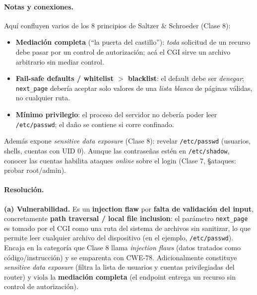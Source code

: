 \paragraph{Notas y conexiones.}
Aquí confluyen varios de los 8 principios de Saltzer \& Schroeder (Clase 8):
\begin{itemize}[leftmargin=1.4em,itemsep=1pt]
  \item \textbf{Mediación completa} (``la puerta del castillo''): \emph{toda} solicitud de un
        recurso debe pasar por un control de autorización; acá el CGI sirve un archivo arbitrario
        sin mediar control.
  \item \textbf{Fail-safe defaults / whitelist $>$ blacklist}: el default debe ser \emph{denegar};
        \texttt{next\_page} debería aceptar solo valores de una \emph{lista blanca} de páginas
        válidas, no cualquier ruta.
  \item \textbf{Mínimo privilegio}: el proceso del servidor no debería poder leer
        \texttt{/etc/passwd}; el daño se contiene si corre confinado.
\end{itemize}
Además expone \emph{sensitive data exposure} (Clase 8): revelar \texttt{/etc/passwd} (usuarios,
shells, cuentas con UID 0). Aunque las contraseñas estén en \texttt{/etc/shadow}, conocer las
cuentas habilita ataques \emph{online} sobre el login (Clase 7, \S ataques: probar root/admin).

\paragraph{Resolución.}
\textbf{(a) Vulnerabilidad.} Es un \textbf{injection flaw} por \textbf{falta de validación del
input}, concretamente \textbf{path traversal / local file inclusion}: el parámetro
\texttt{next\_page} es tomado por el CGI como una ruta del sistema de archivos sin sanitizar, lo
que permite leer cualquier archivo del dispositivo (en el ejemplo, \texttt{/etc/passwd}). Encaja
en la categoría que Clase 8 llama \emph{injection flaws} (datos tratados como código/instrucción)
y se emparenta con CWE-78. Adicionalmente constituye \emph{sensitive data exposure} (filtra la
lista de usuarios y cuentas privilegiadas del router) y viola la \textbf{mediación completa} (el
endpoint entrega un recurso sin control de autorización).

